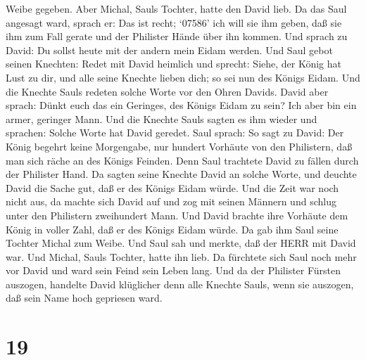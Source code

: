 Weibe gegeben.  Aber Michal, Sauls Tochter, hatte den David
lieb. Da das Saul angesagt ward, sprach er: Das ist recht; 
`07586' ich will sie ihm geben, daß sie ihm zum Fall gerate und der
Philister Hände über ihn kommen. Und sprach zu David: Du sollst heute
mit der andern mein Eidam werden.  Und Saul gebot seinen
Knechten: Redet mit David heimlich und sprecht: Siehe, der König hat
Lust zu dir, und alle seine Knechte lieben dich; so sei nun des Königs
Eidam.  Und die Knechte Sauls redeten solche Worte vor den
Ohren Davids. David aber sprach: Dünkt euch das ein Geringes, des Königs
Eidam zu sein? Ich aber bin ein armer, geringer Mann.  Und
die Knechte Sauls sagten es ihm wieder und sprachen: Solche Worte hat
David geredet.  Saul sprach: So sagt zu David: Der König
begehrt keine Morgengabe, nur hundert Vorhäute von den Philistern, daß
man sich räche an des Königs Feinden. Denn Saul trachtete David zu
fällen durch der Philister Hand.  Da sagten seine Knechte
David an solche Worte, und deuchte David die Sache gut, daß er des
Königs Eidam würde. Und die Zeit war noch nicht aus,  da
machte sich David auf und zog mit seinen Männern und schlug unter den
Philistern zweihundert Mann. Und David brachte ihre Vorhäute dem König
in voller Zahl, daß er des Königs Eidam würde. Da gab ihm Saul seine
Tochter Michal zum Weibe.  Und Saul sah und merkte, daß der
HERR mit David war. Und Michal, Sauls Tochter, hatte ihn lieb.
 Da fürchtete sich Saul noch mehr vor David und ward sein
Feind sein Leben lang.  Und da der Philister Fürsten
auszogen, handelte David klüglicher denn alle Knechte Sauls, wenn sie
auszogen, daß sein Name hoch gepriesen ward.

\hypertarget{section-18}{%
\section{19}\label{section-18}}

